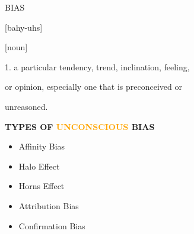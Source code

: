 \documentclass{beamer}
\begin{document}
\begin{frame}
    \begin{center}
    \begin{minipage}{.5\textwidth}
        \LARGE{BIAS}
    \end{minipage}
    \begin{minipage}{.3\textwidth}
        \normalsize{[bahy-uhs]}
    \end{minipage}
    \vspace{.5cm}

    \hspace{-8cm} \normalsize{[noun]}\\
    \end{center}
    \hspace{.8cm} \normalsize{1. a particular tendency, trend, inclination, feeling,}

    \hspace{1cm} \normalsize{or opinion, especially one that is preconceived or}

    \hspace{1cm} \normalsize{unreasoned.}
\end{frame}

\begin{frame}
    \begin{center}
        \textbf{\Large{TYPES OF \textcolor{orange}{UNCONSCIOUS} BIAS}} \\
        \hspace{1.5cm}

        \begin{minipage}{0.50\textwidth}
        \begin{itemize}
            \item Affinity Bias
            \item Halo Effect
            \item Horns Effect
            \item Attribution Bias
            \item Confirmation Bias
        \end{itemize}
        \end{minipage}
    \end{center}
\end{frame}

\end{document}
